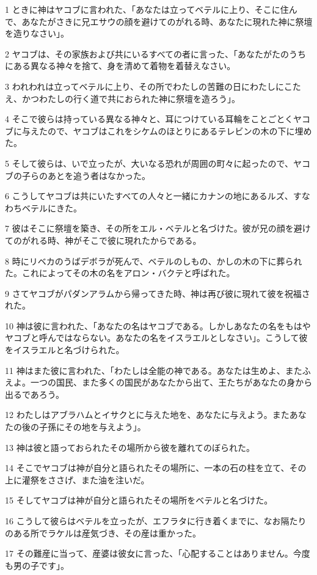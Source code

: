 \par 1 ときに神はヤコブに言われた、「あなたは立ってベテルに上り、そこに住んで、あなたがさきに兄エサウの顔を避けてのがれる時、あなたに現れた神に祭壇を造りなさい」。
\par 2 ヤコブは、その家族および共にいるすべての者に言った、「あなたがたのうちにある異なる神々を捨て、身を清めて着物を着替えなさい。
\par 3 われわれは立ってベテルに上り、その所でわたしの苦難の日にわたしにこたえ、かつわたしの行く道で共におられた神に祭壇を造ろう」。
\par 4 そこで彼らは持っている異なる神々と、耳につけている耳輪をことごとくヤコブに与えたので、ヤコブはこれをシケムのほとりにあるテレビンの木の下に埋めた。
\par 5 そして彼らは、いで立ったが、大いなる恐れが周囲の町々に起ったので、ヤコブの子らのあとを追う者はなかった。
\par 6 こうしてヤコブは共にいたすべての人々と一緒にカナンの地にあるルズ、すなわちベテルにきた。
\par 7 彼はそこに祭壇を築き、その所をエル・ベテルと名づけた。彼が兄の顔を避けてのがれる時、神がそこで彼に現れたからである。
\par 8 時にリベカのうばデボラが死んで、ベテルのしもの、かしの木の下に葬られた。これによってその木の名をアロン・バクテと呼ばれた。
\par 9 さてヤコブがパダンアラムから帰ってきた時、神は再び彼に現れて彼を祝福された。
\par 10 神は彼に言われた、「あなたの名はヤコブである。しかしあなたの名をもはやヤコブと呼んではならない。あなたの名をイスラエルとしなさい」。こうして彼をイスラエルと名づけられた。
\par 11 神はまた彼に言われた、「わたしは全能の神である。あなたは生めよ、またふえよ。一つの国民、また多くの国民があなたから出て、王たちがあなたの身から出るであろう。
\par 12 わたしはアブラハムとイサクとに与えた地を、あなたに与えよう。またあなたの後の子孫にその地を与えよう」。
\par 13 神は彼と語っておられたその場所から彼を離れてのぼられた。
\par 14 そこでヤコブは神が自分と語られたその場所に、一本の石の柱を立て、その上に灌祭をささげ、また油を注いだ。
\par 15 そしてヤコブは神が自分と語られたその場所をベテルと名づけた。
\par 16 こうして彼らはベテルを立ったが、エフラタに行き着くまでに、なお隔たりのある所でラケルは産気づき、その産は重かった。
\par 17 その難産に当って、産婆は彼女に言った、「心配することはありません。今度も男の子です」。
